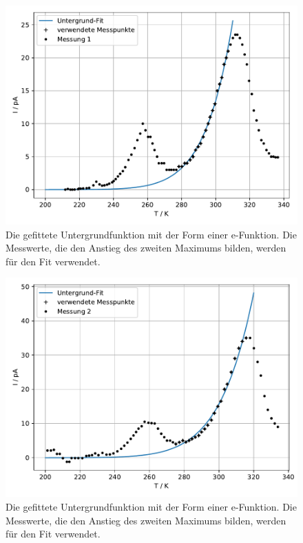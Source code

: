 \begin{figure}
  \centering
  \includegraphics{build/untergrund_1.pdf}
  \caption{Die gefittete Untergrundfunktion mit der Form einer e-Funktion.
   Die Messwerte, die den Anstieg des zweiten Maximums bilden, werden für den Fit verwendet.}
  \label{fig:T_I_plot_1_Untergrund}
\end{figure} %

\begin{figure}
  \centering
  \includegraphics{build/untergrund_2.pdf}
  \caption{Die gefittete Untergrundfunktion mit der Form einer e-Funktion.
  Die Messwerte, die den Anstieg des zweiten Maximums bilden, werden für den Fit verwendet.}
  \label{fig:T_I_plot_2_Untergrund}
\end{figure} %


